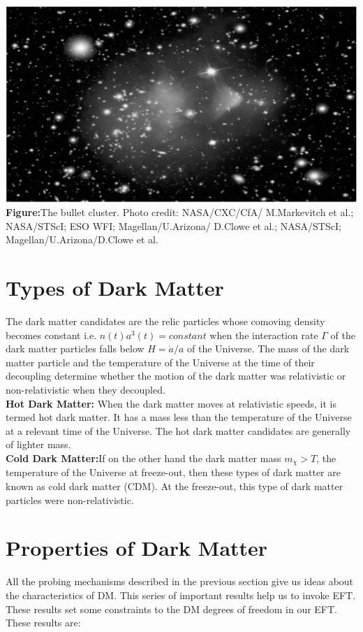 \documentclass[12pt]{report}
\begin{document}
\begin{center}
\includegraphics[scale=0.3]{bclstr.png}\\
\textbf{Figure:}The bullet cluster. Photo credit: NASA/CXC/CfA/ M.Markevitch et
al.; NASA/STScI; ESO WFI; Magellan/U.Arizona/ D.Clowe et al.;
NASA/STScI; Magellan/U.Arizona/D.Clowe et al.
\cite{dmtheory1}
\end{center}

 


\section{Types of Dark Matter}
The dark matter candidates are the relic particles whose comoving density becomes constant i.e. $n(t) a^3(t)= constant$ when the interaction rate $\Gamma$ of the dark matter particles falls below $H= \dot{a}/a$ of the Universe. The mass of the dark matter particle and the temperature of the Universe at the time of their decoupling determine whether the motion of the dark matter was relativistic or non-relativistic when they decoupled.\\

\textbf{Hot Dark Matter:} When the dark matter moves at relativistic speeds, it is termed hot dark matter. It has a mass less than the temperature of the Universe at a relevant time of the Universe. The hot dark matter candidates are generally of lighter mass.\\

\textbf{Cold Dark Matter:}If on the other hand the dark matter mass $m_\chi > T$, the temperature of the Universe at freeze-out, then these types of dark matter are known as cold dark matter (CDM). At the freeze-out, this type of dark matter particles were non-relativistic.


\section{Properties of Dark Matter}
All the probing mechanisms described in the previous section give us ideas about the characteristics of DM. This series of important results help us to invoke EFT. These results set some constraints to the DM degrees of freedom in our EFT. These results are:
\end{document}
